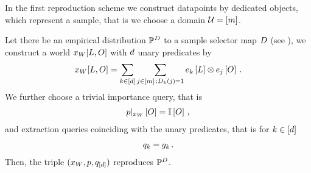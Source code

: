 



In the first reproduction scheme we construct datapoints by dedicated objects, which represent a sample, that is we choose a domain $\mathcal{U}=[m]$.

\begin{theorem}
    \label{the:reproducingSingleObjects}
    Let there be an empirical distribution $\mathbb{P}^{D}$ to a sample selector map $D$ (see ), we construct a world $x_{W}[L,O]$ with $d$ unary predicates by
    \begin{align*}
        x_{W}[L,O]
        = \sum_{k\in[d]} \sum_{j\in[m] \, : D_{k}(j)=1} e_{k}\left[L\right] \otimes e_{j}\left[O\right] \, .
    \end{align*}
    We further choose a trivial importance query, that is
    \begin{align*}
        {p}|_{x_{W}} \left[O\right] = \mathbb{I}\left[O\right] \, ,
    \end{align*}
    and extraction queries coinciding with the unary predicates, that is for $k\in[d]$
    \begin{align*}
        q_{k} = g_{k} \, .
    \end{align*}
    Then, the triple $(x_{W},p,q_{[d]})$ reproduces $\mathbb{P}^{D}$.
\end{theorem}
